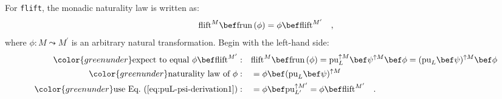 For \lstinline!flift!, the monadic naturality law is written as:
\[
\text{flift}^{M}\bef\text{frun}\,(\phi)=\phi\bef\text{flift}^{M^{\prime}}\quad,
\]
where $\phi:M\leadsto M^{\prime}$ is an arbitrary natural transformation.
Begin with the left-hand side:
\begin{align*}
{\color{greenunder}\text{expect to equal }\phi\bef\text{flift}^{M^{\prime}}:}\quad & \text{flift}^{M}\bef\text{frun}\,(\phi)=\text{pu}_{L}^{\uparrow M}\bef\psi^{\uparrow M}\bef\phi=(\text{pu}_{L}\bef\psi)^{\uparrow M}\bef\phi\\
{\color{greenunder}\text{naturality law of }\phi:}\quad & =\phi\bef(\text{pu}_{L}\bef\psi)^{\uparrow M}\\
{\color{greenunder}\text{use Eq.~(\ref{eq:puL-psi-derivation1})}:}\quad & =\phi\bef\text{pu}_{L^{\prime}}^{\uparrow M^{\prime}}=\phi\bef\text{flift}^{M^{\prime}}\quad.
\end{align*}


